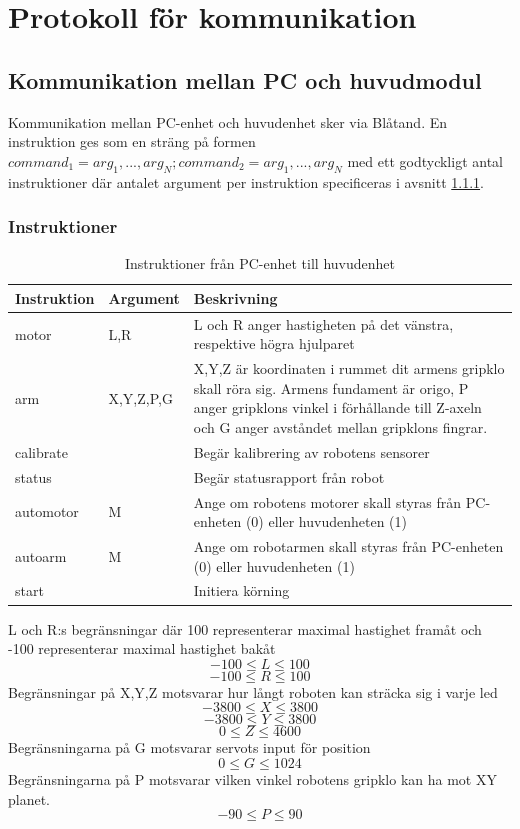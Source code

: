 \section{Protokoll för kommunikation}

\subsection{Kommunikation mellan PC och huvudmodul}\label{designspec:protokoll}

Kommunikation mellan PC-enhet och huvudenhet sker via Blåtand. En instruktion ges som en sträng på formen $command_{1}=arg_{1},...,arg_{N};command_{2}=arg_{1},...,arg_{N}$ med ett godtyckligt antal instruktioner där antalet argument per instruktion specificeras i avsnitt \ref{designspec-protokoll-pc-huvud-kommandon}.

\subsubsection{Instruktioner} \label{designspec-protokoll-pc-huvud-kommandon}

\begin{table}[h]
	\centering
		\begin{tabularx}{\textwidth}{| l | l | X |}
			\hline
			\textbf{Instruktion} & \textbf{Argument} & \textbf{Beskrivning} \\
			\hline
			{motor} & {L,R} & {L och R anger hastigheten på det vänstra, respektive högra hjulparet} \\
			\hline
			{arm} & {X,Y,Z,P,G} & {X,Y,Z är koordinaten i rummet dit armens gripklo skall röra sig. Armens fundament är origo, P anger gripklons vinkel i förhållande till Z-axeln och G anger avståndet mellan gripklons fingrar.} \\
			\hline
			{calibrate} & {} & {Begär kalibrering av robotens sensorer} \\
			\hline
			{status} & {} & {Begär statusrapport från robot} \\
			\hline
			{automotor} & {M} & {Ange om robotens motorer skall styras från PC-enheten (0) eller huvudenheten (1)} \\
			\hline
			{autoarm} & {M} & {Ange om robotarmen skall styras från PC-enheten (0) eller huvudenheten (1)} \\
			\hline
			{start} & {} & {Initiera körning} \\
			\hline
		\end{tabularx}
	\caption{Instruktioner från PC-enhet till huvudenhet} \label{protokoll:pc-huvud}
\end{table}
L och R:s begränsningar där 100 representerar maximal hastighet framåt och -100 representerar maximal hastighet bakåt
$$-100\leq L \leq 100$$
$$-100\leq R \leq 100$$
Begränsningar på X,Y,Z motsvarar hur långt roboten kan sträcka sig i varje led
$$-3800\leq X \leq 3800$$
$$-3800\leq Y \leq 3800$$
$$0\leq Z \leq 4600$$
Begränsningarna på G motsvarar servots input för position
$$0\leq G \leq 1024$$
Begränsningarna på P motsvarar vilken vinkel robotens gripklo kan ha mot XY planet.
$$-90\leq P \leq 90$$

